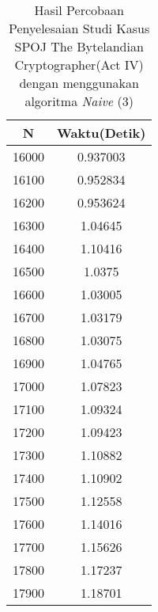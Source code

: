 \begin{table}[H]
\centering
\caption {Hasil Percobaan Penyelesaian Studi Kasus SPOJ The Bytelandian Cryptographer(Act IV) dengan menggunakan algoritma \textit{Naive} (3)}
\begin{tabular}{|c|c|}\hline
N&Waktu(Detik)\\ \hline
16000&0.937003\\ \hline
16100&0.952834\\ \hline
16200&0.953624\\ \hline
16300&1.04645\\ \hline
16400&1.10416\\ \hline
16500&1.0375\\ \hline
16600&1.03005\\ \hline
16700&1.03179\\ \hline
16800&1.03075\\ \hline
16900&1.04765\\ \hline
17000&1.07823\\ \hline
17100&1.09324\\ \hline
17200&1.09423\\ \hline
17300&1.10882\\ \hline
17400&1.10902\\ \hline
17500&1.12558\\ \hline
17600&1.14016\\ \hline
17700&1.15626\\ \hline
17800&1.17237\\ \hline
17900&1.18701\\ \hline
\end{tabular}
\label{tab:res8}
\end{table}
